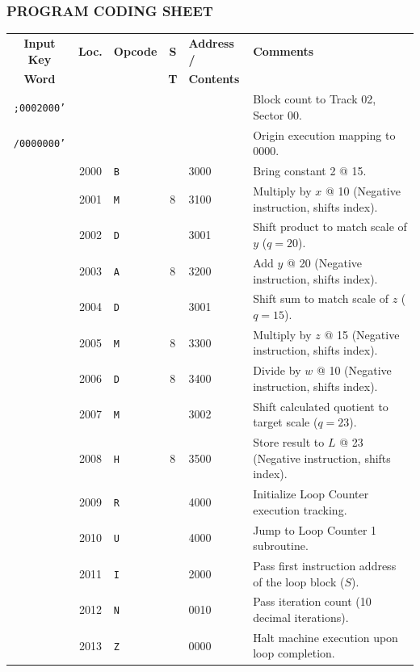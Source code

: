 \subsubsection*{PROGRAM CODING SHEET}
\begin{table}[h!]
\centering
\small
\begin{tabular}{|c|c|l|c|l|p{6cm}|}
\hline
\textbf{Input Key} & \textbf{Loc.} & \textbf{Opcode} & \textbf{S} & \textbf{Address /}  & \textbf{Comments} \\
\textbf{Word}      &               &                 & \textbf{T} & \textbf{Contents} & \\
\hline
\texttt{;0002000'} &      &            &   &      & Block count to Track 02, Sector 00. \\
\texttt{/0000000'} &      &            &   &      & Origin execution mapping to 0000. \\
\hline
                   & 2000 & \texttt{B} &   & 3000 & Bring constant 2 @ 15. \\
                   & 2001 & \texttt{M} & 8 & 3100 & Multiply by $x$ @ 10 (Negative instruction, shifts index). \\
                   & 2002 & \texttt{D} &   & 3001 & Shift product to match scale of $y$ ($q=20$). \\
                   & 2003 & \texttt{A} & 8 & 3200 & Add $y$ @ 20 (Negative instruction, shifts index). \\
                   & 2004 & \texttt{D} &   & 3001 & Shift sum to match scale of $z$ ($q=15$). \\
                   & 2005 & \texttt{M} & 8 & 3300 & Multiply by $z$ @ 15 (Negative instruction, shifts index). \\
                   & 2006 & \texttt{D} & 8 & 3400 & Divide by $w$ @ 10 (Negative instruction, shifts index). \\
                   & 2007 & \texttt{M} &   & 3002 & Shift calculated quotient to target scale ($q=23$). \\
                   & 2008 & \texttt{H} & 8 & 3500 & Store result to $L$ @ 23 (Negative instruction, shifts index). \\
                   & 2009 & \texttt{R} &   & 4000 & Initialize Loop Counter execution tracking. \\
                   & 2010 & \texttt{U} &   & 4000 & Jump to Loop Counter 1 subroutine. \\
                   & 2011 & \texttt{I} &   & 2000 & Pass first instruction address of the loop block ($S$). \\
                   & 2012 & \texttt{N} &   & 0010 & Pass iteration count (10 decimal iterations). \\
                   & 2013 & \texttt{Z} &   & 0000 & Halt machine execution upon loop completion. \\
\hline
\end{tabular}
\normalsize
\end{table}
